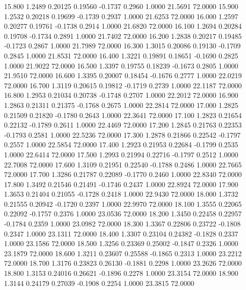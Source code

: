   15.800   1.2489   0.20125   0.19560  -0.1737   0.2960   1.0000  21.5691  72.0000
  15.900   1.2532   0.20218   0.19699  -0.1739   0.2937   1.0000  21.6253  72.0000
  16.000   1.2597   0.20277   0.19761  -0.1738   0.2914   1.0000  21.6820  72.0000
  16.100   1.2694   0.20284   0.19708  -0.1734   0.2891   1.0000  21.7402  72.0000
  16.200   1.2838   0.20217   0.19485  -0.1723   0.2867   1.0000  21.7989  72.0000
  16.300   1.3015   0.20086   0.19130  -0.1709   0.2845   1.0000  21.8531  72.0000
  16.400   1.3221   0.19891   0.18651  -0.1690   0.2825   1.0000  21.9022  72.0000
  16.500   1.3397   0.19755   0.18239  -0.1673   0.2805   1.0000  21.9510  72.0000
  16.600   1.3395   0.20007   0.18454  -0.1676   0.2777   1.0000  22.0219  72.0000
  16.700   1.3119   0.20615   0.19812  -0.1719   0.2739   1.0000  22.1187  72.0000
  16.800   1.2953   0.21034   0.20738  -0.1748   0.2707   1.0000  22.2012  72.0000
  16.900   1.2863   0.21311   0.21375  -0.1768   0.2675   1.0000  22.2814  72.0000
  17.000   1.2825   0.21509   0.21820  -0.1780   0.2643   1.0000  22.3641  72.0000
  17.100   1.2823   0.21654   0.22132  -0.1789   0.2611   1.0000  22.4469  72.0000
  17.200   1.2845   0.21763   0.22353  -0.1793   0.2581   1.0000  22.5236  72.0000
  17.300   1.2878   0.21866   0.22542  -0.1797   0.2557   1.0000  22.5854  72.0000
  17.400   1.2923   0.21953   0.22684  -0.1799   0.2535   1.0000  22.6414  72.0000
  17.500   1.2993   0.21994   0.22716  -0.1797   0.2512   1.0000  22.7008  72.0000
  17.600   1.3109   0.21951   0.22540  -0.1788   0.2486   1.0000  22.7665  72.0000
  17.700   1.3286   0.21787   0.22089  -0.1770   0.2460   1.0000  22.8340  72.0000
  17.800   1.3492   0.21546   0.21491  -0.1746   0.2437   1.0000  22.8924  72.0000
  17.900   1.3653   0.21404   0.21055  -0.1728   0.2418   1.0000  22.9430  72.0000
  18.000   1.3732   0.21555   0.20942  -0.1720   0.2397   1.0000  22.9970  72.0000
  18.100   1.3555   0.22065   0.22092  -0.1757   0.2376   1.0000  23.0536  72.0000
  18.200   1.3450   0.22458   0.22957  -0.1784   0.2359   1.0000  23.0982  72.0000
  18.300   1.3367   0.22806   0.23722  -0.1808   0.2347   1.0000  23.1311  72.0000
  18.400   1.3307   0.23104   0.24382  -0.1828   0.2337   1.0000  23.1586  72.0000
  18.500   1.3256   0.23369   0.25002  -0.1847   0.2326   1.0000  23.1879  72.0000
  18.600   1.3211   0.23607   0.25588  -0.1865   0.2313   1.0000  23.2212  72.0000
  18.700   1.3176   0.23823   0.26130  -0.1881   0.2298   1.0000  23.2626  72.0000
  18.800   1.3153   0.24016   0.26621  -0.1896   0.2278   1.0000  23.3154  72.0000
  18.900   1.3144   0.24179   0.27039  -0.1908   0.2254   1.0000  23.3815  72.0000
